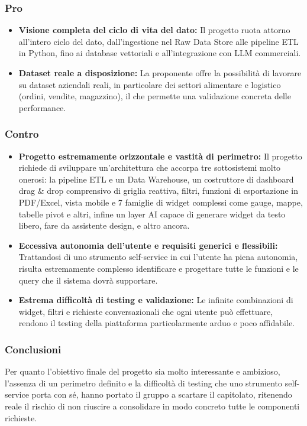 \subsubsection{Pro}
\begin{itemize}
    \item \textbf{Visione completa del ciclo di vita del dato:} Il progetto ruota attorno all'intero ciclo del dato, dall'ingestione nel Raw Data Store alle pipeline ETL in Python, fino ai database vettoriali e all'integrazione con LLM commerciali.
    \item \textbf{Dataset reale a disposizione:} La proponente offre la possibilità di lavorare su dataset aziendali reali, in particolare dei settori alimentare e logistico (ordini, vendite, magazzino), il che permette una validazione concreta delle performance.
\end{itemize}

\subsubsection{Contro}
\begin{itemize}
    \item \textbf{Progetto estremamente orizzontale e vastità di perimetro:} Il progetto richiede di sviluppare un'architettura che accorpa tre sottosistemi molto onerosi: la pipeline ETL e un Data Warehouse, un costruttore di dashboard drag \& drop comprensivo di griglia reattiva, filtri, funzioni di esportazione in PDF/Excel, vista mobile e 7 famiglie di widget complessi come  gauge, mappe, tabelle pivot e altri, infine un layer AI capace di generare widget da testo libero, fare da assistente design, e altro ancora.
    \item \textbf{Eccessiva autonomia dell'utente e requisiti generici e flessibili:} Trattandosi di uno strumento self-service in cui l'utente ha piena autonomia, risulta estremamente complesso identificare e progettare tutte le funzioni e le query che il sistema dovrà supportare.
    \item \textbf{Estrema difficoltà di testing e validazione:} Le infinite combinazioni di widget, filtri e richieste conversazionali che ogni utente può effettuare, rendono il testing della piattaforma particolarmente arduo e poco affidabile.
\end{itemize}

\subsubsection{Conclusioni}
Per quanto l'obiettivo finale del progetto sia molto interessante e ambizioso, l'assenza di un perimetro definito e la difficoltà di testing che uno strumento self-service porta con sé, hanno portato il gruppo a scartare il capitolato, ritenendo reale il rischio di non riuscire a consolidare in modo concreto tutte le componenti richieste.

